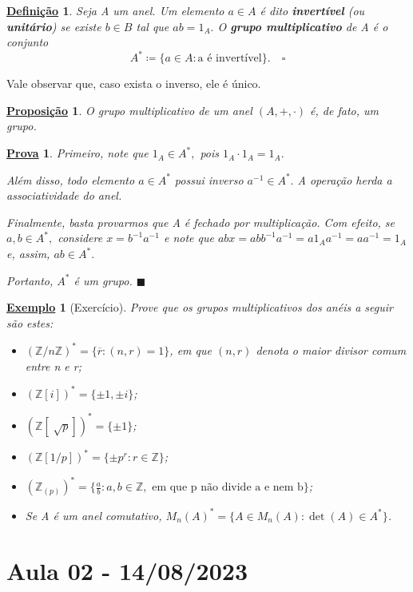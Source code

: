 \documentclass{article}
\newtheorem*{def*}{\underline{Defini\c c\~ao}}
\newtheorem*{prop*}{\underline{Proposi\c c\~ao}}
\newtheorem{example}{\underline{Exemplo}}
\newtheorem*{proof*}{\underline{Prova}}
\renewcommand\qedsymbol{$\blacksquare$}
\begin{document}
\begin{def*}
  Seja A um anel. Um elemento \(a\in A\) é dito \textbf{invertível} (ou \textbf{unitário}) se existe \(b\in B\) tal que \(ab = 1_{A}.\) O \textbf{grupo multiplicativo} de A
é o conjunto 
  \[
    A^{*}\coloneqq \{a\in A: \text{a é invertível}\}.\quad\square
  \]
\end{def*}
  Vale observar que, caso exista o inverso, ele é único.
\begin{prop*}
  O grupo multiplicativo de um anel \((A, +, \cdot )\) é, de fato, um grupo.
\end{prop*}
\begin{proof*}
  Primeiro, note que \(1_{A}\in A^{*},\) pois \(1_{A} \cdot 1_{A} = 1_{A}.\) 

  Além disso, todo elemento \(a\in A^{*}\) possui inverso \(a^{-1}\in A^{*}.\) A operação herda a associatividade do anel. 

  Finalmente, basta provarmos que A é fechado por multiplicação. Com efeito, se \(a, b\in A^{*},\) considere \(x = b^{-1}a^{-1}\) e note que \(abx = abb^{-1}a^{-1} =
a 1_{A} a^{-1} = aa^{-1} = 1_{A}\) e, assim, \(ab\in A^{*}.\)

  Portanto, \(A^{*}\) é um grupo. \qedsymbol
\end{proof*}
\begin{example}[Exercício]
  Prove que os grupos multiplicativos dos anéis a seguir são estes:
\begin{itemize}
  \item[1)] \((\mathbb{Z}/n \mathbb{Z})^{*} = \{\overline{r}: (n, r) = 1\}\), em que \((n, r)\) denota o \textit{maior divisor comum} entre n e r;
  \item[2)] \((\mathbb{Z}[i])^{*}=\{\pm1, \pm i\}\);
  \item[3)] \((\mathbb{Z}[\sqrt[]{p}])^{*} = \{\pm1\}\);
  \item[4)] \((\mathbb{Z}[1/p])^{*} = \{\pm p^{r}: r\in \mathbb{Z}\}\);
  \item[5)] \((\mathbb{Z}_{(p)})^{*} = \biggl\{\frac{a}{b}: a, b\in \mathbb{Z}, \text{ em que p não divide a e nem b}\biggr\}\);
  \item[6)] Se A é um anel comutativo, \(M_{n}(A)^{*} = \{A\in M_{n}(A): \det{(A)}\in A^{*}\}\).
\end{itemize}
\end{example}
\newpage

\section{Aula 02 - 14/08/2023}
\end{document}
